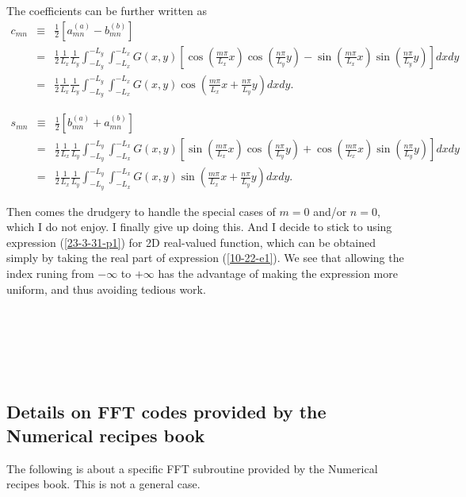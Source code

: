 \documentclass{article}
\begin{document}
The coefficients can be further written as
\begin{eqnarray}
  c_{m n} & \equiv & \frac{1}{2} [a_{m n}^{(a)} - b_{m n}^{(b)}] \nonumber\\
  & = & \frac{1}{2} \frac{1}{L_x}  \frac{1}{L_y} \int_{- L_y}^{- L_y} \int_{-
  L_x}^{- L_x} G (x, y) \left[ \cos \left( \frac{m \pi}{L_x} x \right) \cos
  \left( \frac{n \pi}{L_y} y \right) - \sin \left( \frac{m \pi}{L_x} x \right)
  \sin \left( \frac{n \pi}{L_y} y \right) \right] d x d y \nonumber\\
  & = & \frac{1}{2} \frac{1}{L_x}  \frac{1}{L_y} \int_{- L_y}^{- L_y} \int_{-
  L_x}^{- L_x} G (x, y) \cos \left( \frac{m \pi}{L_x} x + \frac{n \pi}{L_y} y
  \right) d x d y. 
\end{eqnarray}

\begin{eqnarray}
  s_{m n} & \equiv & \frac{1}{2} [b_{m n}^{(a)} + a_{m n}^{(b)}] \nonumber\\
  & = & \frac{1}{2} \frac{1}{L_x}  \frac{1}{L_y} \int_{- L_y}^{- L_y} \int_{-
  L_x}^{- L_x} G (x, y) \left[ \sin \left( \frac{m \pi}{L_x} x \right) \cos
  \left( \frac{n \pi}{L_y} y \right) + \cos \left( \frac{m \pi}{L_x} x \right)
  \sin \left( \frac{n \pi}{L_y} y \right) \right] d x d y \nonumber\\
  & = & \frac{1}{2} \frac{1}{L_x}  \frac{1}{L_y} \int_{- L_y}^{- L_y} \int_{-
  L_x}^{- L_x} G (x, y) \sin \left( \frac{m \pi}{L_x} x + \frac{n \pi}{L_y} y
  \right) d x d y. 
\end{eqnarray}


Then comes the drudgery to handle the special cases of $m = 0$ and/or $n = 0$,
which I do not enjoy. I finally give up doing this. And I decide to stick to
using expression (\ref{23-3-31-p1}) for 2D real-valued function, which can be
obtained simply by taking the real part of expression (\ref{10-22-e1}). We see
that allowing the index runing from $- \infty$ to $+ \infty$ has the advantage
of making the expression more uniform, and thus avoiding tedious work.

\

\

\

\subsection{Details on FFT codes provided by the Numerical recipes
book{\cite{press1992}}}

The following is about a specific FFT subroutine provided by the Numerical
recipes book{\cite{press1992}}. This is not a general case.
\end{document}
